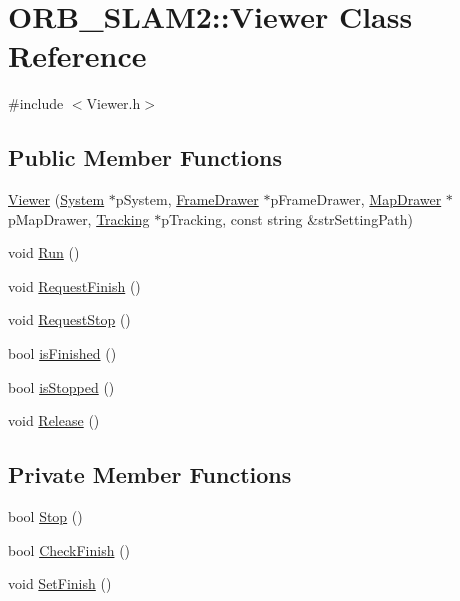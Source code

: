 \hypertarget{class_o_r_b___s_l_a_m2_1_1_viewer}{}\section{O\+R\+B\+\_\+\+S\+L\+A\+M2\+:\+:Viewer Class Reference}
\label{class_o_r_b___s_l_a_m2_1_1_viewer}


{\ttfamily \#include $<$Viewer.\+h$>$}

\subsection*{Public Member Functions}
\begin{DoxyCompactItemize}
\item 
\mbox{\hyperlink{class_o_r_b___s_l_a_m2_1_1_viewer_abe1f6eab6a1976e589f37a14b80c448b}{Viewer}} (\mbox{\hyperlink{class_o_r_b___s_l_a_m2_1_1_system}{System}} $\ast$p\+System, \mbox{\hyperlink{class_o_r_b___s_l_a_m2_1_1_frame_drawer}{Frame\+Drawer}} $\ast$p\+Frame\+Drawer, \mbox{\hyperlink{class_o_r_b___s_l_a_m2_1_1_map_drawer}{Map\+Drawer}} $\ast$p\+Map\+Drawer, \mbox{\hyperlink{class_o_r_b___s_l_a_m2_1_1_tracking}{Tracking}} $\ast$p\+Tracking, const string \&str\+Setting\+Path)
\item 
void \mbox{\hyperlink{class_o_r_b___s_l_a_m2_1_1_viewer_a68c269890714298034997be622f09947}{Run}} ()
\item 
void \mbox{\hyperlink{class_o_r_b___s_l_a_m2_1_1_viewer_af9079c4e563099cf3c8cda403c854cf8}{Request\+Finish}} ()
\item 
void \mbox{\hyperlink{class_o_r_b___s_l_a_m2_1_1_viewer_a4b23bbdcc2c5898d074870785a3e07c5}{Request\+Stop}} ()
\item 
bool \mbox{\hyperlink{class_o_r_b___s_l_a_m2_1_1_viewer_a51c55a1f1ad05a6ba2c6b57f9133f88d}{is\+Finished}} ()
\item 
bool \mbox{\hyperlink{class_o_r_b___s_l_a_m2_1_1_viewer_aa1888ef340152348f395a814ddfb362f}{is\+Stopped}} ()
\item 
void \mbox{\hyperlink{class_o_r_b___s_l_a_m2_1_1_viewer_a2b0eeffd84b5d94a4c4f4e0db174c9fe}{Release}} ()
\end{DoxyCompactItemize}
\subsection*{Private Member Functions}
\begin{DoxyCompactItemize}
\item 
bool \mbox{\hyperlink{class_o_r_b___s_l_a_m2_1_1_viewer_abf0704bc29f282192c5e5c36f66fa255}{Stop}} ()
\item 
bool \mbox{\hyperlink{class_o_r_b___s_l_a_m2_1_1_viewer_ad8085f7f51887cea273e0f6357137439}{Check\+Finish}} ()
\item 
void \mbox{\hyperlink{class_o_r_b___s_l_a_m2_1_1_viewer_aa6962b0695ea6c2164e9ce2b10de80a0}{Set\+Finish}} ()
\end{DoxyCompactItemize}
